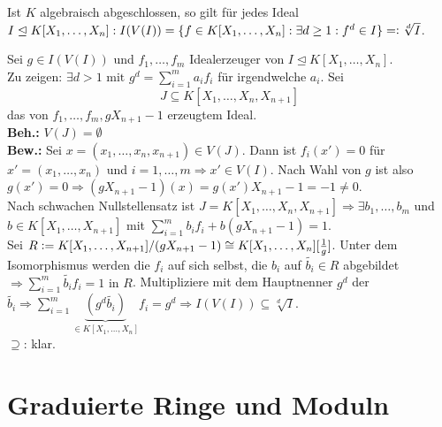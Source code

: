 \documentclass[a4paper, 10pt]{report}
\begin{document}
\begin{nnSatz}
  Ist $K$ algebraisch abgeschlossen, so gilt für jedes Ideal $I \trianglelefteq K[X_1, \dots, X_n]: I(V(I)) = \{ f \in K[X_1, \dots, X_n]: \exists d \ge 1: f^d \in I \} =\mathrel{\mathop:} \sqrt[d]{I}$.
\end{nnSatz}

\begin{Bew}
  Sei $g \in I(V(I))$ und $f_1, \dots, f_m$ Idealerzeuger von $I \trianglelefteq K[X_1, \dots, X_n]$.\\
  Zu zeigen: $\exists d > 1 \text{ mit } g^d = \sum_{i = 1}^m a_i f_i$ für irgendwelche $a_i$.
  Sei 
  \[
  J \subseteq K[X_1, \dots, X_n, X_{n+1}]
  \]
  das von $f_1, \dots, f_m, gX_{n+1}-1$ erzeugtem Ideal.\\
  \textbf{Beh.:} $V(J) = \emptyset$\\
  \textbf{Bew.:} Sei $x = (x_1, \dots, x_n, x_{n+1}) \in V(J)$.
  Dann ist $f_i(x') = 0$ für $x' = (x_1, \dots, x_n)$ und $i = 1, \dots, m \Rightarrow x' \in V(I)$.
  Nach Wahl von $g$ ist also $g(x') = 0 \Rightarrow (gX_{n+1}-1)(x)
  = g(x') X_{n+1} - 1 = -1 \not= 0$.\\
  Nach schwachen Nullstellensatz ist $J = K[X_1, \dots, X_n,X_{n+1}] \Rightarrow \exists b_1,
  \dots, b_m$ und $b \in K[X_1, \dots, X_{n+1}]$ mit $\sum_{i=1}^m b_i f_i + b(gX_{n+1} - 1) = 1$.\\
  Sei $R \mathrel{\mathop:}= K[X_1, \dots, X_{n+1}]/ (gX_{n+1} - 1) \cong K[X_1, \dots, X_n][\frac{1}{g}]$. Unter dem Isomorphismus werden die $f_i$ auf sich selbst, die $b_i$ auf $\tilde{b_i} \in R$ abgebildet $\Rightarrow \sum_{i = 1}^m \tilde{b_i} f_i = 1 \text{ in } R$.
  Multipliziere mit dem Hauptnenner $g^d$ der $\tilde{b_i} \Rightarrow \sum_{i = 1}^m \underset{\in K[X_1, \dots, X_n]}{\underbrace{(g^d \tilde{b_i})}} f_i = g^d \Rightarrow I(V(I)) \subseteq \sqrt[d]{I}$.\\
  \glqq$\supseteq$\grqq: klar.
\end{Bew}

\section{Graduierte Ringe und Moduln}
\end{document}
